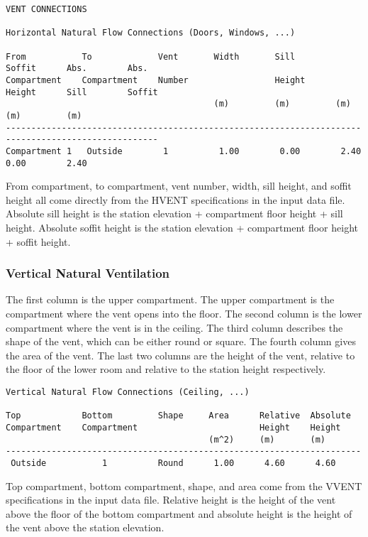 \begin{lstlisting}[basicstyle=\scriptsize]
VENT CONNECTIONS

Horizontal Natural Flow Connections (Doors, Windows, ...)

From           To             Vent       Width       Sill        Soffit      Abs.        Abs.
Compartment    Compartment    Number                 Height      Height      Sill        Soffit
                                         (m)         (m)         (m)         (m)         (m)
----------------------------------------------------------------------------------------------------
Compartment 1   Outside        1          1.00        0.00        2.40        0.00        2.40
\end{lstlisting}
From compartment, to compartment, vent number, width, sill height, and soffit height all come directly from the HVENT specifications in the input data file. Absolute sill height is the station elevation + compartment floor height + sill height. Absolute soffit height is the station elevation + compartment floor height + soffit height.

\subsubsection{Vertical Natural Ventilation}

The first column is the upper compartment.  The upper compartment is the compartment where the vent opens into the floor.  The second column is the lower compartment where the vent is in the ceiling.  The third column describes the shape of the vent, which can be either round or square.  The fourth column gives the area of the vent.  The last two columns are the height of the vent, relative to the floor of the lower room and relative to the station height respectively.
\begin{lstlisting}[basicstyle=\scriptsize]
Vertical Natural Flow Connections (Ceiling, ...)

Top            Bottom         Shape     Area      Relative  Absolute
Compartment    Compartment                        Height    Height
                                        (m^2)     (m)       (m)
----------------------------------------------------------------------
 Outside           1          Round      1.00      4.60      4.60
\end{lstlisting}
Top compartment, bottom compartment, shape, and area come from the VVENT specifications in the input data file. Relative height is the height of the vent above the floor of the bottom compartment and absolute height is the height of the vent above the station elevation.

